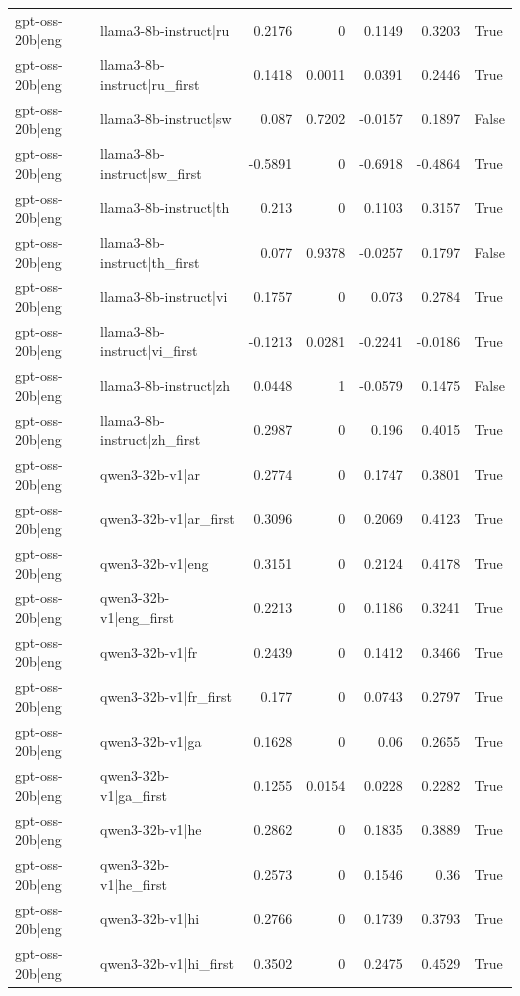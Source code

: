 \begin{table}
\begin{tabular}{l l r r r r l}
gpt-oss-20b|eng & llama3-8b-instruct|ru & 0.2176 & 0 & 0.1149 & 0.3203 & True \\
gpt-oss-20b|eng & llama3-8b-instruct|ru_first & 0.1418 & 0.0011 & 0.0391 & 0.2446 & True \\
gpt-oss-20b|eng & llama3-8b-instruct|sw & 0.087 & 0.7202 & -0.0157 & 0.1897 & False \\
gpt-oss-20b|eng & llama3-8b-instruct|sw_first & -0.5891 & 0 & -0.6918 & -0.4864 & True \\
gpt-oss-20b|eng & llama3-8b-instruct|th & 0.213 & 0 & 0.1103 & 0.3157 & True \\
gpt-oss-20b|eng & llama3-8b-instruct|th_first & 0.077 & 0.9378 & -0.0257 & 0.1797 & False \\
gpt-oss-20b|eng & llama3-8b-instruct|vi & 0.1757 & 0 & 0.073 & 0.2784 & True \\
gpt-oss-20b|eng & llama3-8b-instruct|vi_first & -0.1213 & 0.0281 & -0.2241 & -0.0186 & True \\
gpt-oss-20b|eng & llama3-8b-instruct|zh & 0.0448 & 1 & -0.0579 & 0.1475 & False \\
gpt-oss-20b|eng & llama3-8b-instruct|zh_first & 0.2987 & 0 & 0.196 & 0.4015 & True \\
gpt-oss-20b|eng & qwen3-32b-v1|ar & 0.2774 & 0 & 0.1747 & 0.3801 & True \\
gpt-oss-20b|eng & qwen3-32b-v1|ar_first & 0.3096 & 0 & 0.2069 & 0.4123 & True \\
gpt-oss-20b|eng & qwen3-32b-v1|eng & 0.3151 & 0 & 0.2124 & 0.4178 & True \\
gpt-oss-20b|eng & qwen3-32b-v1|eng_first & 0.2213 & 0 & 0.1186 & 0.3241 & True \\
gpt-oss-20b|eng & qwen3-32b-v1|fr & 0.2439 & 0 & 0.1412 & 0.3466 & True \\
gpt-oss-20b|eng & qwen3-32b-v1|fr_first & 0.177 & 0 & 0.0743 & 0.2797 & True \\
gpt-oss-20b|eng & qwen3-32b-v1|ga & 0.1628 & 0 & 0.06 & 0.2655 & True \\
gpt-oss-20b|eng & qwen3-32b-v1|ga_first & 0.1255 & 0.0154 & 0.0228 & 0.2282 & True \\
gpt-oss-20b|eng & qwen3-32b-v1|he & 0.2862 & 0 & 0.1835 & 0.3889 & True \\
gpt-oss-20b|eng & qwen3-32b-v1|he_first & 0.2573 & 0 & 0.1546 & 0.36 & True \\
gpt-oss-20b|eng & qwen3-32b-v1|hi & 0.2766 & 0 & 0.1739 & 0.3793 & True \\
gpt-oss-20b|eng & qwen3-32b-v1|hi_first & 0.3502 & 0 & 0.2475 & 0.4529 & True \\

\end{tabular}
\end{table}
